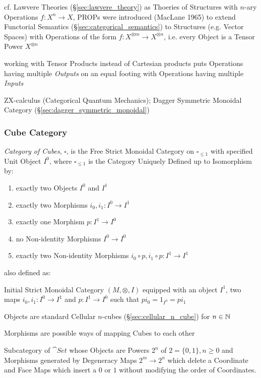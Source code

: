 \fist cf. Lawvere Theories (\S\ref{sec:lawvere_theory}) as Thoeries of
Structures with $n$-ary Operations $f : X^n \rightarrow X$, PROPs were
introduced (MacLane 1965) to extend Functorial Semantics
(\S\ref{sec:categorical_semantics}) to Structures (e.g. Vector Spaces) with
Operations of the form $f : X^{\otimes m} \rightarrow X^{\otimes n}$, i.e.
every Object is a Tensor Power $X^{\otimes n}$

working with Tensor Products instead of Cartesian products puts Operations
having multiple \emph{Outputs} on an equal footing with Operations having
multiple \emph{Inputs}

ZX-calculus (Categorical Quantum Mechanics); Dagger Symmetric Monoidal Category
(\S\ref{sec:dagger_symmetric_monoidal})



\subsubsection{Cube Category}\label{sec:cube_category}

\emph{Category of Cubes}, $\square$, is the Free Strict Monoidal
Category on $\square_{\leq 1}$ with specified Unit Object $I^0$, where
$\square_{\leq 1}$ is the Category Uniquely Defined up to Isomorphism
by:
\begin{enumerate}
  \item exactly two Objects $I^0$ and $I^1$
  \item exactly two Morphisms $i_0, i_1 : I^0 \rightarrow I^1$
  \item exactly one Morphism $p : I^1 \rightarrow I^0$
  \item no Non-identity Morphisms $I^0 \rightarrow I^0$
  \item exactly two Non-identity Morphisms
    $i_0 \circ p, i_1 \circ p : I^1 \rightarrow I^1$
\end{enumerate}

also defined as:

Initial Strict Monoidal Category $(M, \otimes, I)$ equipped with an
object $I^1$, two maps $i_0, i_1 : I^0 \rightarrow I^1$ and $p : I^1
\rightarrow I^0$ such that $pi_0 = 1_{I^0} = pi_1$

Objects are standard Cellular $n$-cubes (\S\ref{sec:cellular_n_cube})
for $n \in \mathbb{N}$

Morphisms are possible ways of mapping Cubes to each other

Subcategory of $\cat{Set}$ whose Objects are Powers $2^n$ of $2 =
\{0,1\}, n \geq 0$ and Morphisms generated by Degeneracy Maps $2^m
\rightarrow 2^n$ which delete a Coordinate and Face Maps which insert
a $0$ or $1$ without modifying the order of Coordinates. %



